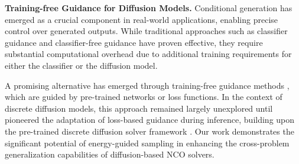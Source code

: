 \noindent\textbf{Training-free Guidance for Diffusion Models.} Conditional generation has emerged as a crucial component in real-world applications, enabling precise control over generated outputs. While traditional approaches such as classifier guidance \cite{dhariwal2021diffusion} and classifier-free guidance \cite{ho2022classifier} have proven effective, they require substantial computational overhead due to additional training requirements for either the classifier or the diffusion model.

A promising alternative has emerged through training-free guidance methods \cite{bansal2023universal, chung2022diffusion, yu2023freedom, shen2024understanding}, which are guided by pre-trained networks or loss functions. In the context of discrete diffusion models, this approach remained largely unexplored until \cite{li2024distribution} pioneered the adaptation of loss-based guidance during inference, building upon the pre-trained discrete diffusion solver framework \cite{sun2023difusco}. Our work demonstrates the significant potential of energy-guided sampling in enhancing the cross-problem generalization capabilities of diffusion-based NCO solvers.